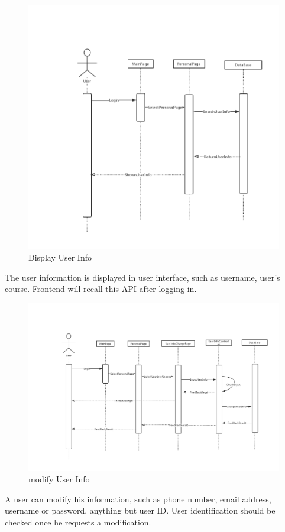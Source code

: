 \documentclass[16pt]{scrreprt}
\begin{document}
\begin{figure}[H]
    \includegraphics[width=\linewidth]{./FuncPhoto/3.png}   
    \caption{Display User Info}
\end{figure}
The user information is displayed in user interface, such as username, user's course. Frontend will recall this API after logging in.

\begin{figure}[H]
    \includegraphics[width=\linewidth]{./FuncPhoto/4.png}   
    \caption{modify User Info}
\end{figure}
A user can modify his information, such as phone number, email address, username or password, anything but user ID. User identification should be checked once he requests a modification.
\end{document}
